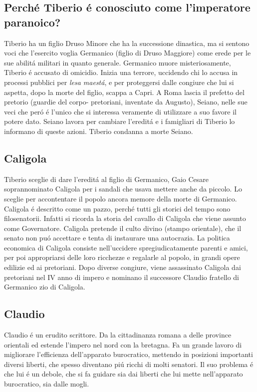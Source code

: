 \documentclass{article}
\begin{document}
\subsection{Perché Tiberio é conosciuto come l'imperatore paranoico?}
Tiberio ha un figlio Druso Minore che ha la successione dinastica, ma si sentono voci che l'esercito voglia Germanico (figlio di Druso Maggiore) come erede per le sue abilitá militari in quanto generale. Germanico muore misteriosamente, Tiberio é accusato di omicidio. Inizia una terrore, uccidendo chi lo accusa in processi pubblici per \textit{lesa maestá}, e per proteggersi dalle congiure che lui si aspetta, dopo la morte del figlio, scappa a Capri. A Roma lascia il prefetto del pretorio (guardie del corpo- pretoriani, inventate da Augusto), Seiano, nelle sue veci che peró é l'unico che si interessa veramente di utilizzare a suo favore il potere dato. Seiano lavora per cambiare l'ereditá e i famigliari di Tiberio lo informano di queste azioni. Tiberio condanna a morte Seiano.

\subsection{Caligola}
Tiberio sceglie di dare l'ereditá al figlio di Germanico, Gaio Cesare soprannominato Caligola per i sandali che usava mettere anche da piccolo. Lo sceglie per accontentare il popolo ancora memore della morte di Germanico. Caligola é descritto come un pazzo, perché tutti gli storici del tempo sono filosenatorii. Infatti si ricorda la storia del cavallo di Caligola che viene assunto come Governatore. Caligola pretende il culto divino (stampo orientale), che il senato non puó accettare e tenta di instaurare una autocrazia. La politica economica di Caligola consiste nell'uccidere spregiudicatamente parenti e amici, per poi appropriarsi delle loro ricchezze e regalarle al popolo, in grandi opere edilizie ed ai pretoriani. Dopo diverse congiure, viene assassinato Caligola dai pretoriani nel IV anno di impero e nominano il successore Claudio fratello di Germanico zio di Caligola.

\subsection{Claudio}
Claudio é un erudito scrittore. Da la cittadinanza romana a delle province orientali ed estende l'impero nel nord con la bretagna. Fa un grande lavoro di migliorare l'efficienza dell'apparato burocratico, mettendo in posizioni importanti diversi liberti, che spesso diventano piú ricchi di molti senatori. Il suo problema é che lui é un debole, che si fa guidare sia dai liberti che lui mette nell'apparato burocratico, sia dalle mogli.
\end{document}
